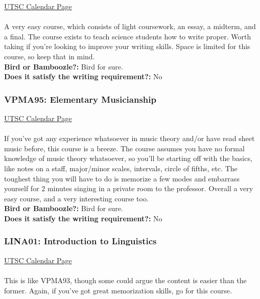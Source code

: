 \documentclass[11pt]{article}
\begin{document}
\href{https://utsc.calendar.utoronto.ca/course/engb02h3}{UTSC Calendar Page}\\\\

A very easy course, which consists of light coursework, an essay, a midterm, and a final.  The course exists to teach science students how to write proper.  Worth taking if you're looking to improve your writing skills.  Space is limited for this course, so keep that in mind.\\

\textbf{Bird or Bamboozle?:} Bird for sure.\\

\textbf{Does it satisfy the writing requirement?:} No

\subsubsection{VPMA95: Elementary Musicianship}

\href{https://utsc.calendar.utoronto.ca/course/VPMA95H3}{UTSC Calendar Page}\\\\

If you've got any experience whatsoever in music theory and/or have read sheet music before, this course is a breeze.  The course assumes you have no formal knowledge of music theory whatsoever, so you'll be starting off with the basics, like notes on a staff, major/minor scales, intervals, circle of fifths, etc.  The toughest thing you will have to do is memorize a few modes and embarrass yourself for 2 minutes singing in a private room to the professor. Overall a very easy course, and a very interesting course too.\\

\textbf{Bird or Bamboozle?:} Bird for sure.\\

\textbf{Does it satisfy the writing requirement?:} No

\subsubsection{LINA01: Introduction to Linguistics}

\href{https://utsc.calendar.utoronto.ca/course/LINA01H3}{UTSC Calendar Page}\\\\
This is like VPMA93, though some could argue the content is easier than the former.  Again, if you've got great memorization skills, go for this course. \\
\end{document}
